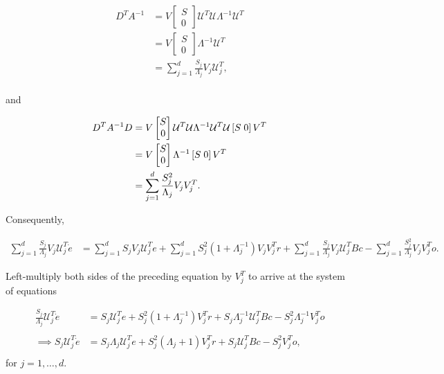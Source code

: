 \begin{enumerate}
\begin{align*}
     D^{T} A^{-1}  &= V \begin{bmatrix} S \\ 0\end{bmatrix} \mathcal{U}^T  \mathcal{U} \Lambda^{-1} \mathcal{U}^T \\
     &= V \begin{bmatrix} S \\ 0\end{bmatrix} \Lambda^{-1} \mathcal{U}^T \\
     &= \sum_{j = 1}^{d} \frac{S_j}{ \Lambda_j} V_j \mathcal{U}_j^T,
\end{align*}\\

and

\begin{align*}
D^{T} A^{-1} D  &= V \begin{bmatrix} S \\ 0\end{bmatrix} \mathcal{U}^T  \mathcal{U} \Lambda^{-1} \mathcal{U}^T \mathcal{U} \left[S \hspace{1mm} 0 \right] V^T \\
  &= V \begin{bmatrix} S \\ 0\end{bmatrix} \Lambda^{-1} \left[S \hspace{1mm} 0 \right] V^T \\
  &= \sum_{j = 1}^{d} \frac{S_j^2}{ \Lambda_j} V_j V_j^T.
\end{align*}

Consequently, 

\begin{align}
    \label{eq:derivation_sub_svd}
    \sum_{j = 1}^{d} \frac{S_j}{ \Lambda_j} V_j \mathcal{U}_j^T \dot{e} &= 
     \sum_{j=1}^d S_j V_j  \mathcal{U}_j^T e
    +
    \sum_{j = 1}^{d} S_j^2 (1 + \Lambda_j^{-1}) V_j V_j^T r
    + 
    \sum_{j = 1}^{d} \frac{S_j}{ \Lambda_j} V_j \mathcal{U}_j^TBc 
    -
    \sum_{j = 1}^{d} \frac{S_j^2}{ \Lambda_j} V_j V_j^T o.
\end{align}


Left-multiply both sides of the preceding equation by $V_j^T$ to arrive at the system of equations

\begin{align*}
    \frac{S_j}{\Lambda_j} \mathcal{U}_j^T \dot{e} &= 
    S_j \mathcal{U}_j^T e
    +
    S_j^2 (1 + \Lambda_j^{-1})V_j^T r 
    +
    S_j \Lambda_j^{-1} \mathcal{U}_j^T B c
    -
    S_j^2 \Lambda_j^{-1} V_j^T o\\
    \\ \implies 
    S_j \mathcal{U}_j^T \dot{e} &= 
    S_j \Lambda_j \mathcal{U}_j^T e
    +
    S_j^2 (\Lambda_j + 1) V_j^T r 
    +
    S_j \mathcal{U}_j^T B c
    -
    S_j^2 V_j^T o,\\
\end{align*}
for $j = 1, \ldots, d$.


\end{enumerate}
